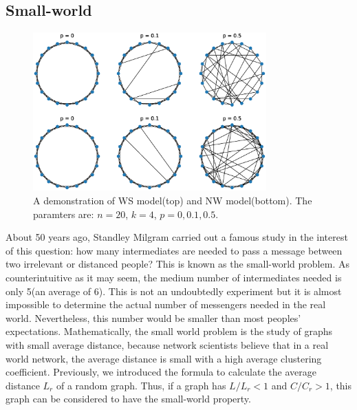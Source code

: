\documentclass[12pt]{article}
\begin{document}
\subsection{Small-world}
\label{small_world}

\begin{figure}[h]
    \includegraphics[width = 0.8\textwidth]{small_world_network_model.eps}
    \centering
    \caption{A demonstration of WS model(top) and NW model(bottom). The paramters are: $n=20$, $k=4$, $p=0,0.1,0.5$.}
    \label{fig:small_world_models}
\end{figure}
About 50 years ago, Standley Milgram\cite{milgram1967small} carried out a famous study in the interest of this question: how many intermediates are needed to pass a message between two irrelevant or distanced people? This is known as the small-world problem. As counterintuitive as it may seem, the medium number of intermediates needed is only 5(an average of 6)\cite{milgram1967small}. This is not an undoubtedly experiment but it is almost impossible to determine the actual number of messengers needed in the real world. Nevertheless, this number would be smaller than most peoples' expectations. Mathematically, the small world problem is the study of graphs with small average distance, because network scientists believe that in a real world network, the average distance is small with a high average clustering coefficient. Previously, we introduced the formula to calculate the average distance $L_r$ of a random graph. Thus, if a graph has $L/L_r <1$ and $C/C_r>1$, this graph can be considered to have the small-world property.\\
\par
\end{document}
